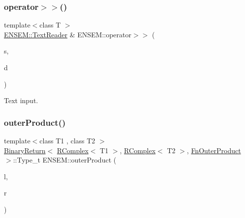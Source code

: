 \subsubsection{\texorpdfstring{operator$>$$>$()}{operator>>()}\hspace{0.1cm}{\footnotesize\ttfamily [2/2]}}
{\footnotesize\ttfamily template$<$class T $>$ \\
\mbox{\hyperlink{classENSEM_1_1TextReader}{E\+N\+S\+E\+M\+::\+Text\+Reader}} \& E\+N\+S\+E\+M\+::operator$>$$>$ (\begin{DoxyParamCaption}\item[{\mbox{\hyperlink{classENSEM_1_1TextReader}{E\+N\+S\+E\+M\+::\+Text\+Reader}} \&}]{s,  }\item[{\mbox{\hyperlink{classENSEM_1_1RComplex}{R\+Complex}}$<$ T $>$ \&}]{d }\end{DoxyParamCaption})\hspace{0.3cm}{\ttfamily [inline]}}



Text input. 

\mbox{\label{group__rcomplex_gaf9789ce4e93ec3781ea59cb4f44afe38}} 
\subsubsection{\texorpdfstring{outerProduct()}{outerProduct()}\hspace{0.1cm}{\footnotesize\ttfamily [1/3]}}
{\footnotesize\ttfamily template$<$class T1 , class T2 $>$ \\
\mbox{\hyperlink{structENSEM_1_1BinaryReturn}{Binary\+Return}}$<$ \mbox{\hyperlink{classENSEM_1_1RComplex}{R\+Complex}}$<$ T1 $>$, \mbox{\hyperlink{classENSEM_1_1RComplex}{R\+Complex}}$<$ T2 $>$, \mbox{\hyperlink{structENSEM_1_1FnOuterProduct}{Fn\+Outer\+Product}} $>$\+::Type\+\_\+t E\+N\+S\+E\+M\+::outer\+Product (\begin{DoxyParamCaption}\item[{const \mbox{\hyperlink{classENSEM_1_1RComplex}{R\+Complex}}$<$ T1 $>$ \&}]{l,  }\item[{const \mbox{\hyperlink{classENSEM_1_1RComplex}{R\+Complex}}$<$ T2 $>$ \&}]{r }\end{DoxyParamCaption})\hspace{0.3cm}{\ttfamily [inline]}}



